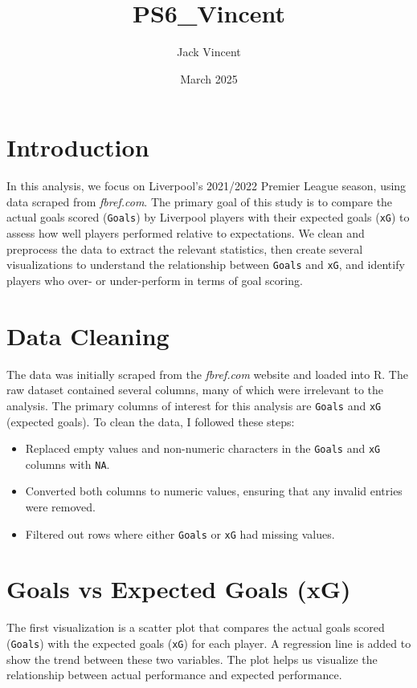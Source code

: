 \documentclass{article}
\title{PS6_Vincent}
\author{Jack Vincent}
\date{March 2025}
\begin{document}
\maketitle

\section{Introduction}

In this analysis, we focus on Liverpool's 2021/2022 Premier League season, using data scraped from \textit{fbref.com}. The primary goal of this study is to compare the actual goals scored (\texttt{Goals}) by Liverpool players with their expected goals (\texttt{xG}) to assess how well players performed relative to expectations. We clean and preprocess the data to extract the relevant statistics, then create several visualizations to understand the relationship between \texttt{Goals} and \texttt{xG}, and identify players who over- or under-perform in terms of goal scoring.

\section{Data Cleaning}

The data was initially scraped from the \textit{fbref.com} website and loaded into R. The raw dataset contained several columns, many of which were irrelevant to the analysis. The primary columns of interest for this analysis are \texttt{Goals} and \texttt{xG} (expected goals). To clean the data, I followed these steps:

\begin{itemize}
  \item Replaced empty values and non-numeric characters in the \texttt{Goals} and \texttt{xG} columns with \texttt{NA}.
  \item Converted both columns to numeric values, ensuring that any invalid entries were removed.
  \item Filtered out rows where either \texttt{Goals} or \texttt{xG} had missing values.
\end{itemize}

\section{Goals vs Expected Goals (xG)}

The first visualization is a scatter plot that compares the actual goals scored (\texttt{Goals}) with the expected goals (\texttt{xG}) for each player. A regression line is added to show the trend between these two variables. The plot helps us visualize the relationship between actual performance and expected performance. 
\end{document}
